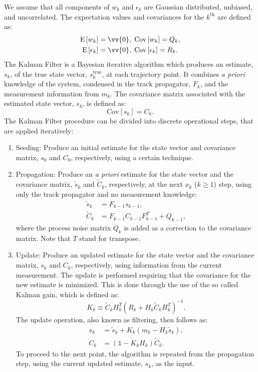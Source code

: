 We assume that all components of $w_k$ and $\epsilon_k$ are Gaussian distributed, unbiased, and uncorrelated. The expectation values and covariances for the $k^\textrm{th}$ are defined as:
\begin{align}
    \text{E}\left[w_k\right]&=\vv{0}, \;\text{Cov}\left[w_k\right]=Q_k, \\  
    \text{E}\left[\epsilon_k\right]&=\vv{0}, \;  \text{Cov}\left[\epsilon_k\right]=R_k.
\end{align}
The Kalman Filter is a Bayesian iterative algorithm which produces an estimate,  $s_k$, of the true state vector, $s_k^{\textrm{true}}$, at each trajectory point. It combines \textit{a priori} knowledge of the system, condensed in the track propagator, $F_k$, and the measurement information from $m_k$. The covariance matrix associated with the estimated state vector, $s_k$, is defined as:
\begin{equation} \label{eq:covdef}
    \text{Cov}\left[s_k\right] = C_k.
\end{equation}
The Kalman Filter procedure can be divided into discrete operational steps, that are applied iteratively:
\begin{enumerate}
    \item Seeding: Produce an initial estimate for the state vector and covariance matrix, $s_0$ and $C_0$, respectively, using a certain technique.
    \item Propagation: Produce an \textit{a priori} estimate for the state vector and the covariance matrix, $\widetilde{s}_k$ and $\widetilde{C}_k$, respectively, at the next $x_k$ ($k\ge1$) step, using only the track propagator and no measurement knowledge:
    \begin{align}
        \widetilde{s}_k&=F_{k-1}s_{k-1},\label{eq:prop} \\
        \widetilde{C}_k&=F_{k-1}C_{k-1}F_{k-1}^T+Q_{k-1},\label{eq:pcov}
    \end{align}
    where the process noise matrix $Q_k$ is added as a correction to the covariance matrix. Note that $T$ stand for transpose.
    \item Update: Produce an updated estimate for the state vector and the covariance matrix, $s_k$  and $C_k$, respectively, using information from the current measurement. The update is performed requiring that the covariance for the new estimate is minimized. This is done through the use of the so called Kalman gain, which is defined as:
    \begin{equation}
        K_k\equiv\widetilde{C}_k H_k^T\left(R_k+H_k \widetilde{C}_k H_k^T\right)^{-1}.\label{eq:kgain}
    \end{equation}
    The update operation, also known as filtering, then follows as:
    \begin{align}
        s_k&=\widetilde{s}_k+K_k\left(m_k-H_k \widetilde{s}_k\right),\label{eq:updates}\\
        C_k&=\left(\mathbb{1}-K_kH_k\right)\widetilde{C}_k.\label{eq:updatec}
    \end{align}
 To proceed to the next point, the algorithm is repeated from the propagation step, using the current updated estimate, $s_k$, as the input. 
\end{enumerate}
